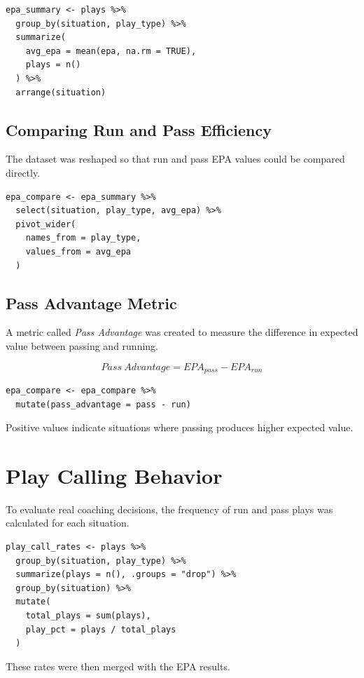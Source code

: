\documentclass[12pt]{article}
\begin{document}
\begin{lstlisting}
epa_summary <- plays %>%
  group_by(situation, play_type) %>%
  summarize(
    avg_epa = mean(epa, na.rm = TRUE),
    plays = n()
  ) %>%
  arrange(situation)
\end{lstlisting}

\subsection{Comparing Run and Pass Efficiency}

The dataset was reshaped so that run and pass EPA values could be compared directly.

\begin{lstlisting}
epa_compare <- epa_summary %>%
  select(situation, play_type, avg_epa) %>%
  pivot_wider(
    names_from = play_type,
    values_from = avg_epa
  )
\end{lstlisting}

\subsection{Pass Advantage Metric}

A metric called \textit{Pass Advantage} was created to measure the difference in expected value between passing and running.

\[
Pass\ Advantage = EPA_{pass} - EPA_{run}
\]

\begin{lstlisting}
epa_compare <- epa_compare %>%
  mutate(pass_advantage = pass - run)
\end{lstlisting}

Positive values indicate situations where passing produces higher expected value.

\section{Play Calling Behavior}

To evaluate real coaching decisions, the frequency of run and pass plays was calculated for each situation.

\begin{lstlisting}
play_call_rates <- plays %>%
  group_by(situation, play_type) %>%
  summarize(plays = n(), .groups = "drop") %>%
  group_by(situation) %>%
  mutate(
    total_plays = sum(plays),
    play_pct = plays / total_plays
  )
\end{lstlisting}

These rates were then merged with the EPA results.
\end{document}
